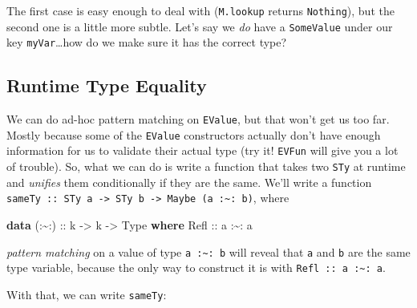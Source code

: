 \documentclass[]{article}
\newenvironment{Shaded}{}{}
\newcommand{\DataTypeTok}[1]{\textcolor[rgb]{0.56,0.13,0.00}{#1}}
\newcommand{\KeywordTok}[1]{\textcolor[rgb]{0.00,0.44,0.13}{\textbf{#1}}}
\newcommand{\NormalTok}[1]{#1}
\newcommand{\OperatorTok}[1]{\textcolor[rgb]{0.40,0.40,0.40}{#1}}
\newcommand{\OtherTok}[1]{\textcolor[rgb]{0.00,0.44,0.13}{#1}}
\begin{document}
The first case is easy enough to deal with (\texttt{M.lookup} returns
\texttt{Nothing}), but the second one is a little more subtle. Let's say we
\emph{do} have a \texttt{SomeValue} under our key \texttt{myVar}\ldots how do we
make sure it has the correct type?

\subsection{Runtime Type Equality}\label{runtime-type-equality}

We can do ad-hoc pattern matching on \texttt{EValue}, but that won't get us too
far. Mostly because some of the \texttt{EValue} constructors actually don't have
enough information for us to validate their actual type (try it! \texttt{EVFun}
will give you a lot of trouble). So, what we can do is write a function that
takes two \texttt{STy} at runtime and \emph{unifies} them conditionally if they
are the same. We'll write a function
\texttt{sameTy\ ::\ STy\ a\ -\textgreater{}\ STy\ b\ -\textgreater{}\ Maybe\ (a\ :\textasciitilde{}:\ b)},
where

\begin{Shaded}
\begin{Highlighting}[]
\KeywordTok{data}\OtherTok{ (:\textasciitilde{}:) ::}\NormalTok{ k }\OtherTok{{-}\textgreater{}}\NormalTok{ k }\OtherTok{{-}\textgreater{}} \DataTypeTok{Type} \KeywordTok{where}
    \DataTypeTok{Refl}\OtherTok{ ::}\NormalTok{ a }\OperatorTok{:\textasciitilde{}:}\NormalTok{ a}
\end{Highlighting}
\end{Shaded}

\emph{pattern matching} on a value of type \texttt{a\ :\textasciitilde{}:\ b}
will reveal that \texttt{a} and \texttt{b} are the same type variable, because
the only way to construct it is with
\texttt{Refl\ ::\ a\ :\textasciitilde{}:\ a}.

With that, we can write \texttt{sameTy}:
\end{document}
